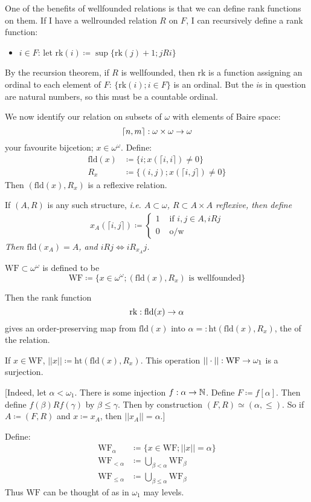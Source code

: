 \documentclass[]{article}
\newcommand{\om}{\omega}
\newcommand{\rk}{\textrm{rk}}
\newcommand{\fld}{\textrm{fld}}
\newcommand{\wf}{\textrm{WF}}
\newcommand{\hit}{\textrm{ht}}
\begin{document}
One of the benefits of wellfounded relations is that we can define rank functions on them. If I have a wellrounded relation $R$ on $F$, I can recursively define a rank function:
\begin{itemize}
    \item $i\in F$: let rk$(i)\coloneqq \sup \{\rk(j)+1;jRi\}$
\end{itemize}
By the recursion theorem, if $R$ is wellfounded, then $\rk$ is a function assigning an ordinal to each element of $F$: $\{\rk(i);i\in F\}$ is an ordinal. But the $i$s in question are natural numbers, so this must be a countable ordinal.

We now identify our relation on subsets of $\om$ with elements of Baire space:
$$ \lceil n,m\rceil :\om\times\om\ra\om$$
your favourite bijcetion; $x \in \om^\om$. Define:
\begin{align*}
    \fld(x)&\coloneqq \{i;x(\lceil i,i\rceil) \ne 0\}\\
    R_x &\coloneqq \{(i,j); x(\lceil i,j\rceil)\ne 0\}
\end{align*}
Then $(\fld(x),R_x)$ is a reflexive relation.

If $(A,R)$ is any such structure, \it{i.e.} $A\subset \om$, $R\subset A\times A$ reflexive, then define
\begin{align*}
    x_A(\lceil i,j\rceil)\coloneqq \left\lbrace \begin{array}{cc} 1 & \textrm{ if }i,j\in A,iRj\\ 0 & \textrm{ o/w}\end{array}\right.
\end{align*}
Then $\fld(x_A) = A$, and $iRj\iff iR_{x_A}j$.


 \begin{defin*}
     $\wf\subset\om^\om$ is defined to be $$\wf \coloneqq \{x \in \om^\om ; (\fld(x),R_x)\textrm{ is wellfounded}\}$$

     Then the rank function $$\rk : \fld(x) \ra \alpha$$ gives an order-preserving map from $\fld(x)$ into $\alpha =: \hit(\fld(x),R_x)$, the  of the relation.

     If $x \in \wf$, $||x|| \coloneqq \hit(\fld(x),R_x)$. This operation $||\cdot || : \wf \ra \omega_1$ is a surjection.

     [Indeed, let $\alpha < \omega_1$. There is some injection $f : \alpha \rightarrow \mathbb{N}$. Define $F\coloneqq f[\alpha]$. Then define $f(\beta) R f(\gamma)$ by $\beta\le \gamma$. Then by construction $(F,R)\simeq (\alpha,\le)$. So if $A\coloneqq (F,R)$ and $x \coloneqq x_A$, then $||x_A|| = \alpha$.]

     Define:
     \begin{align*}
         \wf_\alpha &\coloneqq \{x \in \wf; ||x|| = \alpha \}\\
         \wf_{<\alpha} &\coloneqq \bigcup_{\beta<\alpha}\wf_\beta\\
         \wf_{\le \alpha} &\coloneqq \bigcup_{\beta\le\alpha}\wf_\beta
     \end{align*}
     Thus $\wf$ can be thought of as  in $\om_1$ may levels.
 \end{defin*}
\end{document}
